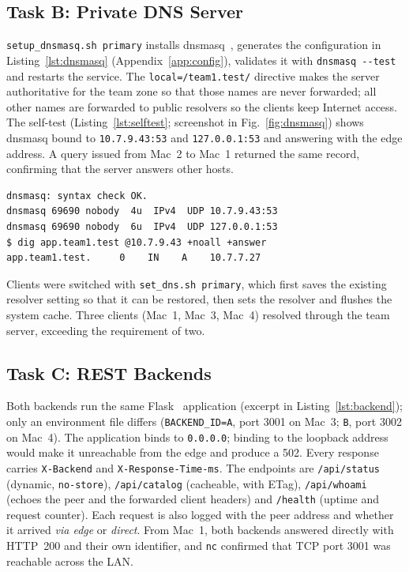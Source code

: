 \documentclass[conference,a4paper]{IEEEtran}
\newcommand{\code}[1]{\texttt{#1}}
\begin{document}
\subsection{Task B: Private DNS Server}
\code{setup\_dnsmasq.sh primary} installs dnsmasq~\cite{dnsmasq}, generates the configuration in
Listing~\ref{lst:dnsmasq} (Appendix~\ref{app:config}), validates it with \code{dnsmasq -{}-test}
and restarts the service. The \code{local=/team1.test/} directive makes the server authoritative
for the team zone so that those names are never forwarded; all other names are forwarded to
public resolvers so the clients keep Internet access. The self-test (Listing~\ref{lst:selftest};
screenshot in Fig.~\ref{fig:dnsmasq}) shows dnsmasq bound to \code{10.7.9.43:53} and
\code{127.0.0.1:53} and answering with the edge address. A query issued from Mac~2 to Mac~1
returned the same record, confirming that the server answers other hosts.
\begin{lstlisting}[caption={Primary DNS self-test on Mac 1 (dnsmasq 2.93)},label={lst:selftest}]
dnsmasq: syntax check OK.
dnsmasq 69690 nobody  4u  IPv4  UDP 10.7.9.43:53
dnsmasq 69690 nobody  6u  IPv4  UDP 127.0.0.1:53
$ dig app.team1.test @10.7.9.43 +noall +answer
app.team1.test.     0    IN    A    10.7.7.27
\end{lstlisting}

Clients were switched with \code{set\_dns.sh primary}, which first saves the existing resolver
setting so that it can be restored, then sets the resolver and flushes the system cache. Three
clients (Mac~1, Mac~3, Mac~4) resolved through the team server, exceeding the requirement of two.

\subsection{Task C: REST Backends}
Both backends run the same Flask~\cite{flask} application (excerpt in
Listing~\ref{lst:backend}); only an environment file differs (\code{BACKEND\_ID=A}, port 3001 on
Mac~3; \code{B}, port 3002 on Mac~4). The application binds to \code{0.0.0.0}; binding to the
loopback address would make it unreachable from the edge and produce a 502. Every response
carries \code{X-Backend} and \code{X-Response-Time-ms}. The endpoints are \code{/api/status}
(dynamic, \code{no-store}), \code{/api/catalog} (cacheable, with ETag), \code{/api/whoami}
(echoes the peer and the forwarded client headers) and \code{/health} (uptime and request
counter). Each request is also logged with the peer address and whether it arrived \emph{via
edge} or \emph{direct}. From Mac~1, both backends answered directly with HTTP~200 and their own
identifier, and \code{nc} confirmed that TCP port 3001 was reachable across the LAN.
\end{document}
